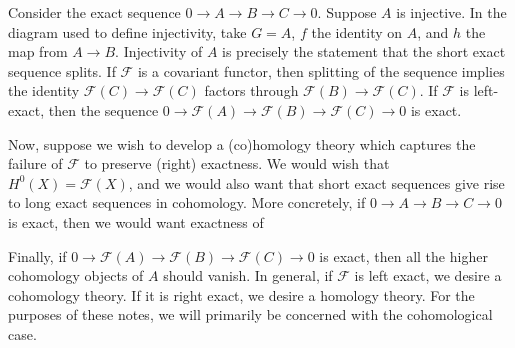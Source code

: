 \begin{remark}
    Consider the exact sequence $0 \to A \to B \to C \to 0$. Suppose $A$ is injective. In the diagram used to define injectivity, take $G=A$, $f$ the identity on $A$, and $h$ the map from $A \to B$. Injectivity of $A$ is precisely the statement that the short exact sequence splits. If $\mathcal{F}$ is a covariant functor, then splitting of the sequence implies the identity $\mathcal{F}(C) \to \mathcal{F}(C)$ factors through $\mathcal{F}(B) \to \mathcal{F}(C)$. If $\mathcal{F}$ is left-exact, then the sequence $0 \to \mathcal{F}(A) \to \mathcal{F}(B) \to \mathcal{F}(C) \to 0$ is exact.
\end{remark}

Now, suppose we wish to develop a (co)homology theory which captures the failure of $\mathcal{F}$ to preserve (right) exactness. We would wish that $H^0(X)=\mathcal{F}(X)$, and we would also want that short exact sequences give rise to long exact sequences in cohomology. More concretely, if $0 \to A \to B \to C \to 0$ is exact, then we would want exactness of
\begin{center}
\end{center}
Finally, if $0 \to \mathcal{F}(A) \to \mathcal{F}(B) \to \mathcal{F}(C) \to 0$ is exact, then all the higher cohomology objects of $A$ should vanish. In general, if $\mathcal{F}$ is left exact, we desire a cohomology theory. If it is right exact, we desire a homology theory. For the purposes of these notes, we will primarily be concerned with the cohomological case.

